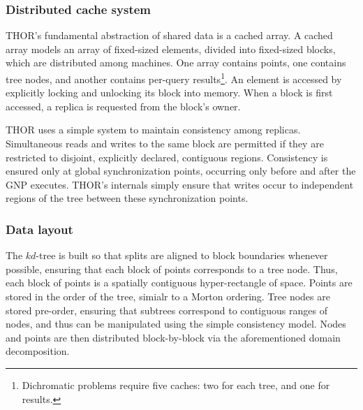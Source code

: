 \documentclass[twoside,leqno,twocolumn]{article}
\newcommand{\mysubsub}[1]{\subsubsection{#1} }
\begin{document}
\mysubsub{Distributed cache system}

THOR's fundamental abstraction of shared data is a cached array.
A cached array models an array of fixed-sized elements, divided into fixed-sized blocks, which are distributed among machines.
One array contains points, one contains tree nodes, and another contains per-query results\footnote{Dichromatic problems require five caches: two for each tree, and one for results.}.
An element is accessed by explicitly locking and unlocking its block into memory.
When a block is first accessed, a replica is requested from the block's owner.

THOR uses a simple system to maintain consistency among replicas.
Simultaneous reads and writes to the same block are permitted if they are restricted to disjoint, explicitly declared, contiguous regions.
Consistency is ensured only at global synchronization points, occurring only before and after the GNP executes.
THOR's internals simply ensure that writes occur to independent regions of the tree between these synchronization points.




\mysubsub{Data layout}
The $kd$-tree is built so that splits are aligned to block boundaries whenever possible, ensuring that each block of points corresponds to a tree node.
Thus, each block of points is a spatially contiguous hyper-rectangle of space.
Points are stored in the order of the tree, simialr to a Morton ordering.
Tree nodes are stored pre-order, ensuring that subtrees correspond to contiguous ranges of nodes, and thus can be manipulated using the simple consistency model.
Nodes and points are then distributed block-by-block via the aforementioned domain decomposition.
\end{document}
